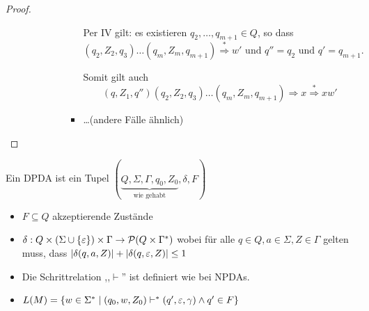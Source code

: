 \begin{proof}
\begin{itemize}
\begin{itemize}
\begin{description}
\begin{itemize}
        Per IV gilt: es existieren $q_2,\ldots,q_{m+1} \in Q$, so dass
        \begin{displaymath}
          (q_2, Z_2, q_3)\ldots(q_m,Z_m,q_{m+1}) \stackrel{*}{\Longrightarrow} w' \text{ und } q''=q_2 \text{ und } q'=q_{m+1}.
        \end{displaymath}

        Somit gilt auch
        \begin{displaymath}
          (q, Z_1, q'') (q_2, Z_2, q_3)\ldots(q_m,Z_m,q_{m+1})\Longrightarrow x\stackrel{*}{\Longrightarrow} xw'
        \end{displaymath}
      \item \ldots (andere Fälle ähnlich)
      \end{itemize}
      \end{description}
  \end{itemize}
\end{itemize}
  
\end{proof}

\begin{Def}[name={[DPDA]}]
	Ein \ac{DPDA} ist ein Tupel $(\underbrace{Q,\Sigma,\Gamma,q_0,Z_0}_{\text{wie gehabt}},\delta,F)$
	\vspace{-1em}
	\begin{itemize}
	\item $F\subseteq Q$ akzeptierende Zustände
	\item $\delta: Q\x (\Sigma\cup\{\Eps\})\x \Gamma \-> \mathcal{P}(Q\x \Gamma^*)$ wobei für alle $q\in Q,a\in\Sigma,Z\in\Gamma$ gelten muss, dass
	$|\delta(q,a,Z)| + |\delta(q,\varepsilon,Z)| \leq 1$
	\item Die Schrittrelation ,,$\vdash$'' ist definiert wie bei NPDAs.
	\item $L(M) = \{w\in\Sigma^* \mid (q_0,w,Z_0) \vdash^* (q',\varepsilon,\gamma) \land q'\in F \}$ \qedhere
	\end{itemize}
\end{Def}

